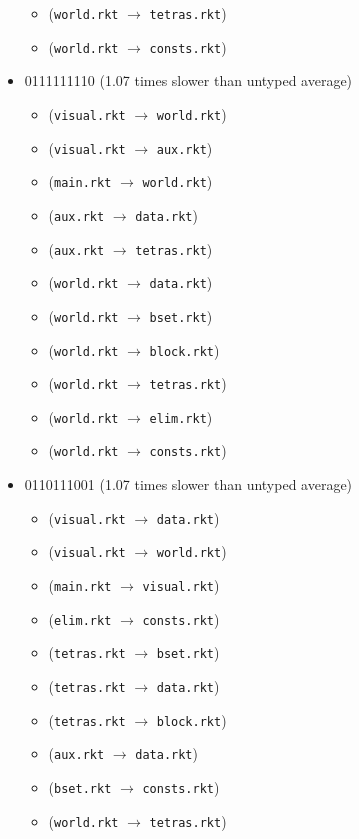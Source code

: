 \documentclass{article}
\newcommand{\mono}[1]{\texttt{#1}}
\begin{document}
\begin{itemize}
\begin{itemize}
  \item (\mono{world.rkt} $\rightarrow$ \mono{tetras.rkt})
  \item (\mono{world.rkt} $\rightarrow$ \mono{consts.rkt})
  \end{itemize}
\item 0111111110 (1.07 times slower than untyped average)
  \begin{itemize}
  \item (\mono{visual.rkt} $\rightarrow$ \mono{world.rkt})
  \item (\mono{visual.rkt} $\rightarrow$ \mono{aux.rkt})
  \item (\mono{main.rkt} $\rightarrow$ \mono{world.rkt})
  \item (\mono{aux.rkt} $\rightarrow$ \mono{data.rkt})
  \item (\mono{aux.rkt} $\rightarrow$ \mono{tetras.rkt})
  \item (\mono{world.rkt} $\rightarrow$ \mono{data.rkt})
  \item (\mono{world.rkt} $\rightarrow$ \mono{bset.rkt})
  \item (\mono{world.rkt} $\rightarrow$ \mono{block.rkt})
  \item (\mono{world.rkt} $\rightarrow$ \mono{tetras.rkt})
  \item (\mono{world.rkt} $\rightarrow$ \mono{elim.rkt})
  \item (\mono{world.rkt} $\rightarrow$ \mono{consts.rkt})
  \end{itemize}
\item 0110111001 (1.07 times slower than untyped average)
  \begin{itemize}
  \item (\mono{visual.rkt} $\rightarrow$ \mono{data.rkt})
  \item (\mono{visual.rkt} $\rightarrow$ \mono{world.rkt})
  \item (\mono{main.rkt} $\rightarrow$ \mono{visual.rkt})
  \item (\mono{elim.rkt} $\rightarrow$ \mono{consts.rkt})
  \item (\mono{tetras.rkt} $\rightarrow$ \mono{bset.rkt})
  \item (\mono{tetras.rkt} $\rightarrow$ \mono{data.rkt})
  \item (\mono{tetras.rkt} $\rightarrow$ \mono{block.rkt})
  \item (\mono{aux.rkt} $\rightarrow$ \mono{data.rkt})
  \item (\mono{bset.rkt} $\rightarrow$ \mono{consts.rkt})
  \item (\mono{world.rkt} $\rightarrow$ \mono{tetras.rkt})

\end{itemize}
\end{itemize}
\end{document}
